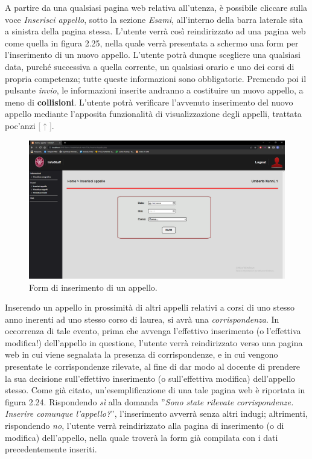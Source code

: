 \documentclass [a4paper,11pt]{book}
\begin{document}
A partire da una qualsiasi pagina web relativa all'utenza, è possibile cliccare sulla voce \emph{Inserisci appello}, sotto la sezione \emph{Esami}, all'interno della barra laterale sita a sinistra della pagina stessa. L'utente verrà così reindirizzato ad una pagina web come quella in figura 2.25, nella quale verrà presentata a schermo una form per l'inserimento di un nuovo appello. L'utente potrà dunque scegliere una qualsiasi data, purché successiva a quella corrente, un qualsiasi orario e uno dei corsi di propria competenza; tutte queste informazioni sono obbligatorie. Premendo poi il pulsante \emph{invio}, le informazioni inserite andranno a costituire un nuovo appello, a meno di \textbf{collisioni}. L'utente potrà verificare l'avvenuto inserimento del nuovo appello mediante l'apposita funzionalità di visualizzazione degli appelli, trattata poc'anzi \hyperref[sec:visualizzaAppelli]{\textcolor{gray}{[$\uparrow$]}}.

\begin{figure}
\centering
\includegraphics[scale=0.3]{figura2-25.png}
\caption{Form di inserimento di un appello.}
\end{figure}

Inserendo un appello in prossimità di altri appelli relativi a corsi di uno stesso anno inerenti ad uno stesso corso di laurea, si avrà una \emph{corrispondenza}. In occorrenza di tale evento, prima che avvenga l'effettivo inserimento (o l'effettiva modifica!) dell'appello in questione, l'utente verrà reindirizzato verso una pagina web in cui viene segnalata la presenza di corrispondenze, e in cui vengono presentate le corrispondenze rilevate, al fine di dar modo al docente di prendere la sua decisione sull'effettivo inserimento (o sull'effettiva modifica) dell'appello stesso. Come già citato, un'esemplificazione di una tale pagina web è riportata in figura 2.24. Rispondendo \emph{sì} alla domanda ''\emph{Sono state rilevate corrispondenze. Inserire comunque l'appello?}'', l'inserimento avverrà senza altri indugi; altrimenti, rispondendo \emph{no}, l'utente verrà reindirizzato alla pagina di inserimento (o di modifica) dell'appello, nella quale troverà la form già compilata con i dati precedentemente inseriti.
\end{document}
